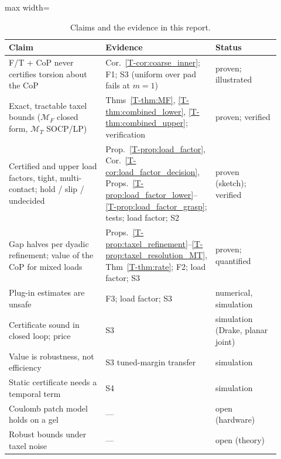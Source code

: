 \documentclass[11pt,a4paper]{article}
\newcommand{\M}{\mathcal M}
\newcommand{\T}[1]{\ref{T-#1}}                       %
\begin{document}
\begin{table}[tbp]
\centering\small
\begin{adjustbox}{max width=\linewidth}\begin{tabular}{@{}p{0.36\linewidth}p{0.32\linewidth}p{0.24\linewidth}@{}}
\toprule
Claim & Evidence & Status \\
\midrule
F/T + CoP never certifies torsion about the CoP & Cor.~\T{cor:coarse_inner}; F1; S3 (uniform over pad fails at $m=1$) & proven; illustrated \\
Exact, tractable taxel bounds ($\M_F$ closed form, $\M_T$ SOCP/LP) & Thms~\T{thm:MF}, \T{thm:combined_lower}, \T{thm:combined_upper}; verification & proven; verified \\
Certified and upper load factors, tight, multi-contact; hold / slip / undecided & Prop.~\T{prop:load_factor}, Cor.~\T{cor:load_factor_decision}, Props.~\T{prop:load_factor_lower}--\T{prop:load_factor_grasp}; tests; load factor; S2 & proven (sketch); verified \\
Gap halves per dyadic refinement; value of the CoP for mixed loads & Props.~\T{prop:taxel_refinement}--\T{prop:taxel_resolution_MT}, Thm~\T{thm:rate}; F2; load factor; S3 & proven; quantified \\
Plug-in estimates are unsafe & F3; load factor; S3 & numerical, simulation \\
Certificate sound in closed loop; price & S3 & simulation (Drake, planar joint) \\
Value is robustness, not efficiency & S3 tuned-margin transfer & simulation \\
Static certificate needs a temporal term & S4 & simulation \\
Coulomb patch model holds on a gel & --- & open (hardware) \\
Robust bounds under taxel noise & --- & open (theory) \\
\bottomrule
\end{tabular}\end{adjustbox}
\caption{Claims and the evidence in this report.}
\label{tab:synthesis}
\end{table}
\end{document}
